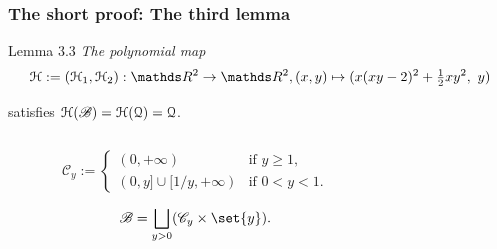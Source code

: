 \documentclass{beamer}
\begin{document}
\begin{frame}
\frametitle{The short proof: The third lemma}

\begin{block}{Lemma 3.3}
\em The polynomial map  \vspace{-0.2cm}
$$
\HH:=(\HH_1,\HH_2):\R^2\to\R^2,(x,y)\mapsto(x(xy-2)^2+\tfrac{1}{2}xy^2,\ y)
$$ \vspace{-0.7cm}

satisfies $\mathcal{H}(\mathscr{B})=\mathcal{H}(\mathcal{Q})=\mathcal{Q}$. \em 
\end{block}
\begin{columns}
\begin{column}{0.5\textwidth}

$$\mathscr{C}_y:= 
\left\{
\begin{array}{ll}
\!\!\!(0,+\infty)&\!\!\!\text{if } y \ge 1,\\
\!\!\!(0,y]\cup[1/y,+\infty) & \!\!\!\text {if } 0<y<1.
\end{array}
\right.
$$

$$
\mathscr{B}=\bigsqcup_{y>0}(\mathscr{C}_y\times\set{y}).
$$

\end{column}
\begin{column}{0.5\textwidth}



\end{column}
\end{columns}
\end{frame}
\end{document}
